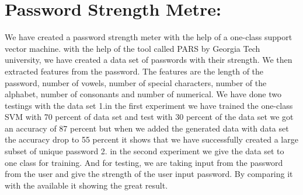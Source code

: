 \documentclass[runningheads]{llncs}
\begin{document}
\section{Password Strength Metre:}
We have created a password strength meter with the help of a one-class support vector machine. with the help of the tool called PARS by Georgia Tech university, we have created a data set of passwords with their strength. We then extracted features from the password. The features are the length of the password, number of vowels, number of special characters, number of the alphabet, number of consonants and number of numerical. We have done two testings with the data set 1.in the first experiment we have trained the one-class SVM with 70 percent of data set and test with 30 percent of the data set we got an accuracy of 87 percent but when we added the generated data with data set the accuracy drop to 55 percent it shows that we have successfully created a large subset of unique password 2. in the second experiment we give the data set to one class for training. And for testing, we are taking input from the password from the user and give the strength of the user input password. By comparing it with the available it showing the great result.
\end{document}
